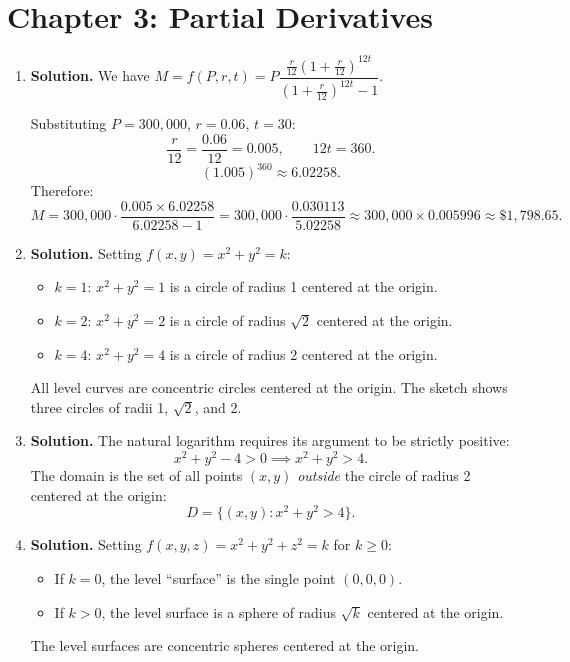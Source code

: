 \chapter{Chapter 3: Partial Derivatives}

\begin{enumerate}


\item \textbf{Solution.}
We have $M = f(P,r,t) = P\dfrac{\frac{r}{12}\left(1+\frac{r}{12}\right)^{12t}}{\left(1+\frac{r}{12}\right)^{12t}-1}$.

Substituting $P = 300{,}000$, $r = 0.06$, $t = 30$:
\[
\frac{r}{12} = \frac{0.06}{12} = 0.005, \qquad 12t = 360.
\]
\[
\left(1.005\right)^{360} \approx 6.02258.
\]
Therefore:
\[
M = 300{,}000 \cdot \frac{0.005 \times 6.02258}{6.02258 - 1} = 300{,}000 \cdot \frac{0.030113}{5.02258} \approx 300{,}000 \times 0.005996 \approx \boxed{\$1{,}798.65}.
\]

\item \textbf{Solution.}
Setting $f(x,y) = x^2 + y^2 = k$:
\begin{itemize}
    \item $k = 1$: $x^2 + y^2 = 1$ is a circle of radius 1 centered at the origin.
    \item $k = 2$: $x^2 + y^2 = 2$ is a circle of radius $\sqrt{2}$ centered at the origin.
    \item $k = 4$: $x^2 + y^2 = 4$ is a circle of radius 2 centered at the origin.
\end{itemize}
All level curves are concentric circles centered at the origin. The sketch shows three circles of radii 1, $\sqrt{2}$, and 2.

\item \textbf{Solution.}
The natural logarithm requires its argument to be strictly positive:
\[
x^2 + y^2 - 4 > 0 \implies x^2 + y^2 > 4.
\]
The domain is the set of all points $(x,y)$ \emph{outside} the circle of radius 2 centered at the origin:
\[
\boxed{D = \{(x,y) : x^2 + y^2 > 4\}}.
\]

\item \textbf{Solution.}
Setting $f(x,y,z) = x^2 + y^2 + z^2 = k$ for $k \geq 0$:
\begin{itemize}
    \item If $k = 0$, the level ``surface'' is the single point $(0,0,0)$.
    \item If $k > 0$, the level surface is a sphere of radius $\sqrt{k}$ centered at the origin.
\end{itemize}
The level surfaces are concentric spheres centered at the origin.


\end{enumerate}
